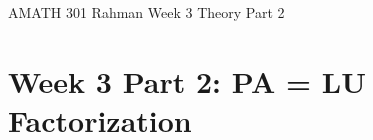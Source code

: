 \documentclass[reqno]{amsart}
\theoremstyle{definition}
\begin{document}
\begin{flushleft}
{\sc \Large AMATH 301 Rahman} \hfill Week 3 Theory Part 2
\bigskip
\end{flushleft}

\newcommand{\R}{\mathbb{R}}
\newcommand{\N}{\mathbb{N}}
\newcommand{\Z}{\mathbb{Z}}
\newcommand{\Q}{\mathbb{Q}}
\renewcommand{\CancelColor}{\color{red}}
\newcommand{\?}{\stackrel{?}{=}}
\renewcommand{\varphi}{\phi}
\newcommand{\card}{\text{Card}}
\newcommand{\bigzero}{\text{\Huge 0}}
\newcommand{\curvearrowdown}{{\color{red}\rotatebox{90}{$\curvearrowleft$}}}
\newcommand{\curvearrowup}{{\color{red}\rotatebox{90}{$\curvearrowright$}}}



\section*{Week 3 Part 2:  PA = LU Factorization}
\end{document}
